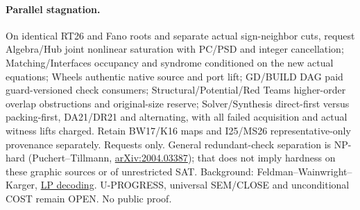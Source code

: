 \documentclass[11pt]{article}
\begin{document}
\paragraph{Parallel stagnation.}
On identical RT26 and Fano roots and separate actual sign-neighbor cuts, request Algebra/Hub joint nonlinear saturation with PC/PSD and integer cancellation; Matching/Interfaces occupancy and syndrome conditioned on the new actual equations; Wheels authentic native source and port lift; GD/BUILD DAG paid guard-versioned check consumers; Structural/Potential/Red Teams higher-order overlap obstructions and original-size reserve; Solver/Synthesis direct-first versus packing-first, DA21/DR21 and alternating, with all failed acquisition and actual witness lifts charged. Retain BW17/K16 maps and I25/MS26 representative-only provenance separately. Requests only. General redundant-check separation is NP-hard (Puchert--Tillmann, \href{https://arxiv.org/abs/2004.03387}{arXiv:2004.03387}); that does not imply hardness on these graphic sources or of unrestricted SAT. Background: Feldman--Wainwright--Karger, \href{https://doi.org/10.1109/TIT.2004.842696}{LP decoding}. U-PROGRESS, universal SEM/CLOSE and unconditional COST remain OPEN. No public proof.
\end{document}
